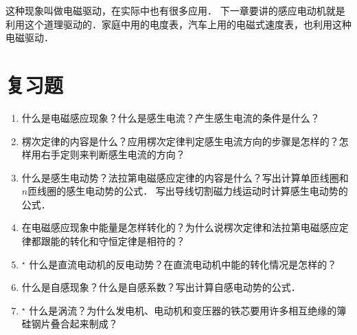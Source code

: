 \begin{enumerate}
这种现象叫做电磁驱动，在实际中也有很多应用．
下一章要讲的感应电动机就是利用这个道理驱动的．家庭中用的电度表，汽车上用的电磁式速度表，也利用这种电磁驱动．
\end{enumerate}

\section*{复习题}
\begin{enumerate}
    \item 什么是电磁感应现象？什么是感生电流？产生感生电流的条件是什么？
    \item 楞次定律的内容是什么？应用楞次定律判定感生电流方向的步骤是怎样的？怎样用右手定则来判断感生电流的方向？
    \item 什么是感生电动势？法拉第电磁感应定律的内容是什么？写出计算单匝线圈和$n$匝线圈的感生电动势的公式．
    写出导线切割磁力线运动时计算感生电动势的公式．
    \item 在电磁感应现象中能量是怎样转化的？为什么说楞次定律和法拉第电磁感应定律都跟能的转化和守恒定律是相符的？
    \item$^\star$ 什么是直流电动机的反电动势？在直流电动机中能的转化情况是怎样的？
    \item 什么是自感现象？什么是自感系数？写出计算自感电动势的公式．
    \item$^\star$ 什么是涡流？为什么发电机、电动机和变压器的铁芯要用许多相互绝缘的簿硅钢片叠合起来制成？
\end{enumerate}

